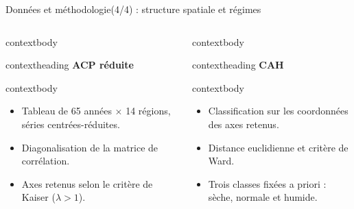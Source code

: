 \documentclass[aspectratio=169,11pt]{beamer}
\begin{document}
\begin{frame}{Données et méthodologie(4/4) : structure spatiale et régimes}
  \small
  \begin{columns}[T,onlytextwidth]
      \begin{beamercolorbox}[wd=\linewidth,rounded=true,sep=0pt]{contextbody}
        \begin{beamercolorbox}[wd=\linewidth,ht=0.42cm,dp=0.08cm,leftskip=0.16cm]{contextheading}
          \bfseries ACP réduite
        \end{beamercolorbox}
        \begin{beamercolorbox}[wd=\linewidth,sep=0.08cm]{contextbody}
          \footnotesize
          \begin{itemize}
            \setlength\itemsep{0.06cm}
            \item Tableau de 65 années $\times$ 14 régions, séries centrées-réduites.
            \item Diagonalisation de la matrice de corrélation.
            \item Axes retenus selon le critère de Kaiser ($\lambda>1$).
          \end{itemize}
        \end{beamercolorbox}
      \end{beamercolorbox}
      \vspace{0.14cm}
      \begin{beamercolorbox}[wd=\linewidth,rounded=true,sep=0pt]{contextbody}
        \begin{beamercolorbox}[wd=\linewidth,ht=0.42cm,dp=0.08cm,leftskip=0.16cm]{contextheading}
          \bfseries CAH
        \end{beamercolorbox}
        \begin{beamercolorbox}[wd=\linewidth,sep=0.08cm]{contextbody}
          \footnotesize
          \begin{itemize}
            \setlength\itemsep{0.06cm}
            \item Classification sur les coordonnées des axes retenus.
            \item Distance euclidienne et critère de Ward.
            \item Trois classes fixées a priori : sèche, normale et humide.
          \end{itemize}
        \end{beamercolorbox}
      \end{beamercolorbox}

\end{columns}
\end{frame}
\end{document}
